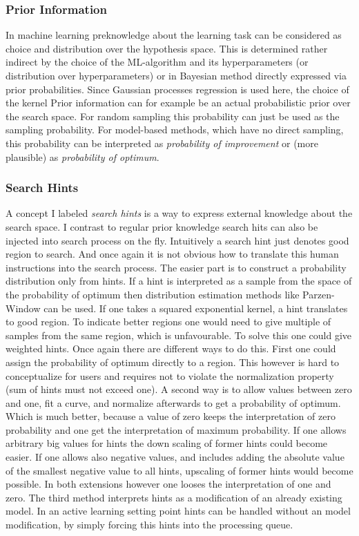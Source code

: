 \documentclass[english]{article}
\begin{document}
\subsubsection*{Prior Information}
In machine learning preknowledge about the learning task can be considered as choice and distribution over the hypothesis space. This is determined rather indirect by the choice of the ML-algorithm and its hyperparameters (or distribution over hyperparameters) or in Bayesian method directly expressed via prior probabilities. Since Gaussian processes regression is used here, the choice of the kernel
Prior information can for example be an actual probabilistic prior over the search space. For random sampling this probability can just be used as the sampling probability. For model-based methods, which have no direct sampling, this probability can be interpreted as \textit{probability of improvement} or (more plausible) as \textit{probability of optimum}.

\subsubsection*{Search Hints}
A concept I labeled \textit{search hints} is a way to express external knowledge about the search space. I contrast to regular prior knowledge search hits can also be injected into search process on the fly. Intuitively a search hint just denotes good region to search. And once again it is not obvious how to translate this human instructions into the search process.
The easier part is to construct a probability distribution only from hints. If a hint is interpreted as a sample from the space of the probability of optimum then distribution estimation methods like Parzen-Window can be used. If one takes a squared exponential kernel, a hint translates to good region. To indicate better regions one would need to give multiple of samples from the same region, which is unfavourable. To solve this one could give weighted hints. Once again there are different ways to do this.
First one could assign the probability of optimum directly to a region. This however is hard to conceptualize for users and requires not to violate the normalization property (sum of hints must not exceed one).
A second way is to allow values between zero and one, fit a curve, and normalize afterwards to get a probability of optimum. Which is much better, because a value of zero keeps the interpretation of zero probability and one get the interpretation of maximum probability. If one allows arbitrary big values for hints the down scaling of former hints could become easier. If one allows also negative values, and includes adding the absolute value of the smallest negative value to all hints, upscaling of former hints would become possible. In both extensions however one looses the interpretation of one and zero.
The third method interprets hints as a modification of an already existing model.
In an active learning setting point hints can be handled without an model modification, by simply forcing this hints into the processing queue.
\end{document}
